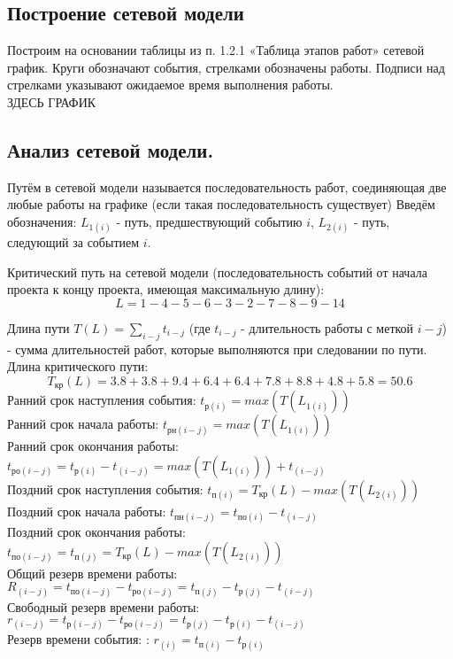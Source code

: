 \subsection{Построение сетевой модели}

Построим на основании таблицы из п. 1.2.1 «Таблица этапов работ» сетевой график. Круги обозначают события, стрелками обозначены работы. Подписи над стрелками указывают ожидаемое время выполнения работы.
\\
ЗДЕСЬ ГРАФИК
\\
\subsection{Анализ сетевой модели.}

Путём в сетевой модели называется последовательность работ, соединя\-ющая две любые работы на графике (если такая последовательность сущест\-вует)
Введём обозначения: $L_{1(i)}$ - путь, предшествующий событию $i$, $L_{2(i)}$ - путь, следующий за событием $i$.

Критический путь на сетевой модели (последовательность событий от начала проекта к концу проекта, имеющая максимальную длину):
$$
L = 1-4-5-6-3-2-7-8-9-14
$$

Длина пути $T(L) = \sum\limits_{i-j}t_{i-j}$ (где $t_{i-j}$ - длительность работы с меткой $i-j$) - сумма длительностей работ, которые выполняются при следовании по пути. Длина критического пути:
$$
T_{\mbox{кр}}(L) = 3.8+3.8+9.4+6.4+6.4+7.8+8.8+4.8+5.8 = 50.6
$$
Ранний срок наступления события: $t_{\mbox{р}(i)} = max(T(L_{1(i)}))$\\
Ранний срок начала работы: $t_{\mbox{рн}(i-j)} = max(T(L_{1(i)}))$\\
Ранний срок окончания работы: $t_{\mbox{ро}(i-j)}= t_{\mbox{р}(i)} - t_{(i-j)} = max(T(L_{1(i)})) + t_{(i-j)} $\\
Поздний срок наступления события: $t_{\mbox{п}(i)}= T_{\mbox{кр}}(L) -  max(T(L_{2(i)}))$\\
Поздний срок начала работы: $t_{\mbox{пн}(i-j)}= t_{\mbox{по}(i)} - t_{(i-j)}$\\
Поздний срок окончания работы: $t_{\mbox{по}(i-j)} = t_{\mbox{п}(j)}= T_{\mbox{кр}}(L) -  max(T(L_{2(i)}))$\\
Общий резерв времени работы: $R_{(i-j)} = t_{\mbox{по}(i-j)} - t_{\mbox{ро}(i-j)} =  t_{\mbox{п}(j)} -  t_{\mbox{р}(j)} -  t_{(i-j)}$\\
Свободный резерв времени работы: $r_{(i-j)} = t_{\mbox{р}(i-j)} - t_{\mbox{ро}(i-j)} =  t_{\mbox{р}(j)} -  t_{\mbox{р}(i)} -  t_{(i-j)}$\\
Резерв времени события: : $r_{(i)} = t_{\mbox{п}(i)} - t_{\mbox{р}(i)} $

